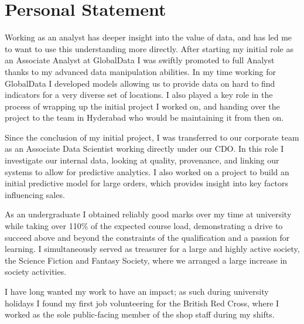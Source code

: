 \documentclass[print, oneside]{friggeri-cv} %
\begin{document}
\section{Personal Statement}
\begin{entrylist}
\entry{}{}{}{}
{

\quad Working as an analyst has deeper insight into the value of data, and has led me to want to use this understanding more directly.
After starting my initial role as an Associate Analyst at GlobalData I was swiftly promoted to full Analyst thanks to my advanced data manipulation abilities.
In my time working for GlobalData I developed models allowing us to provide data on hard to find indicators for a very diverse set of locations.
I also played a key role in the process of wrapping up the initial project I worked on, and handing over the project to the team in Hyderabad who would be maintaining it from then on.

Since the conclusion of my initial project, I was transferred to our corporate team as an Associate Data Scientist working directly under our CDO.
In this role I investigate our internal data, looking at quality, provenance, and linking our systems to allow for predictive analytics.
I also worked on a project to build an initial predictive model for large orders, which provides insight into key factors influencing sales.

\quad As an undergraduate I obtained reliably good marks over my time at university while taking over 110\% of the expected course load, demonstrating a drive to succeed above and beyond the constraints of the qualification and a passion for learning.
I simultaneously served as treasurer for a large and highly active society, the Science Fiction and Fantasy Society, where we arranged a large increase in society activities.

\quad I have long wanted my work to have an impact; as such during university holidays I found  my first job volunteering for the British Red Cross, where I worked as the sole public-facing member of the shop staff during my shifts.

}
\end{entrylist}
\end{document}
